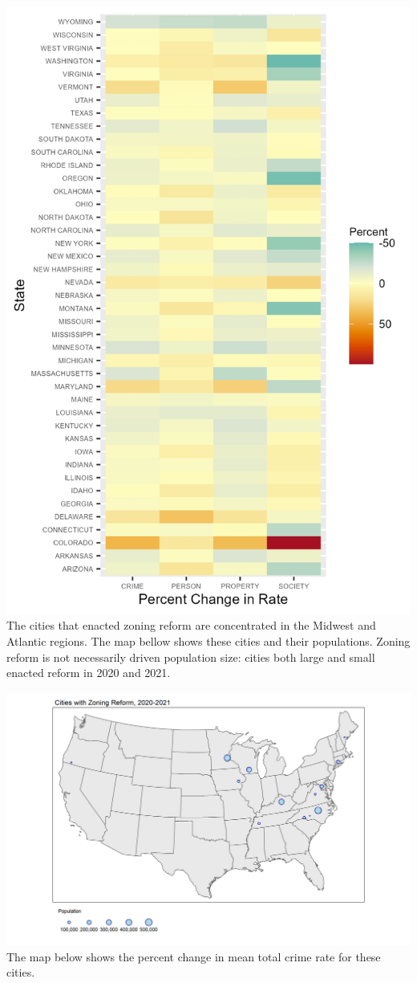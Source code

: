 \documentclass[
  12pt,
]{article}
\begin{document}
\includegraphics{Plots/States_heat.png} The cities that enacted zoning
reform are concentrated in the Midwest and Atlantic regions. The map
bellow shows these cities and their populations. Zoning reform is not
necessarily driven population size: cities both large and small enacted
reform in 2020 and 2021.

\includegraphics{Plots/Cities_pop.png} The map below shows the percent
change in mean total crime rate for these cities.
\end{document}
